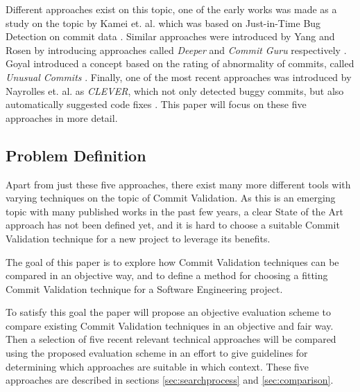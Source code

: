 Different approaches exist on this topic,
one of the early works was made as a study on the topic by Kamei et. al. which was based on Just-in-Time Bug Detection on commit data \cite{Kamei2013}. Similar approaches were introduced by Yang and Rosen by introducing approaches called \textit{Deeper} and \textit{Commit Guru} respectively \cite{Yang2015,Rosen2015}. Goyal introduced a concept based on the rating of abnormality of commits, called \textit{Unusual Commits} \cite{Goyal2017}. Finally, one of the most recent approaches was introduced by Nayrolles et. al. as \textit{CLEVER}, which not only detected buggy commits, but also automatically suggested code fixes \cite{Nayrolles2018}. This paper will focus on these five approaches in more detail.

\subsection{Problem Definition}

Apart from just these five approaches, there exist many more different tools with varying techniques on the topic of Commit Validation.
As this is an emerging topic with many published works in the past few years, a clear State of the Art approach has not been defined yet, and it is hard to choose a suitable Commit Validation technique for a new project to leverage its benefits. 

The goal of this paper is to explore how Commit Validation techniques can be compared in an objective way, and to define a method for choosing a fitting Commit Validation technique for a Software Engineering project.

To satisfy this goal the paper will propose an objective evaluation scheme to compare existing Commit Validation techniques in an objective and fair way. Then a selection of five recent relevant technical approaches will be compared using the proposed evaluation scheme in an effort to give guidelines for determining which approaches are suitable in which context. These five approaches are described in sections \ref{sec:searchprocess} and \ref{sec:comparison}.

